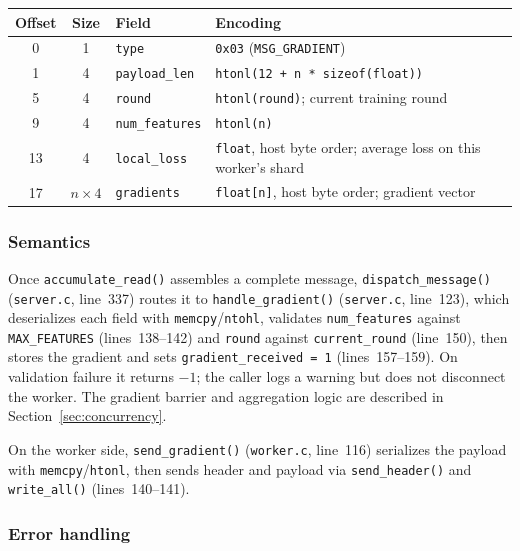 \documentclass[11pt]{article}
\begin{document}
\begin{table}[H]
\centering
\begin{tabular}{@{}c c l l@{}}
\toprule
\textbf{Offset} & \textbf{Size} & \textbf{Field} & \textbf{Encoding} \\
\midrule
0  & 1             & \texttt{type}         & \texttt{0x03} (\texttt{MSG\_GRADIENT}) \\
1  & 4             & \texttt{payload\_len} & \texttt{htonl(12 + n * sizeof(float))} \\
5  & 4             & \texttt{round}        & \texttt{htonl(round)}; current training round \\
9  & 4             & \texttt{num\_features} & \texttt{htonl(n)} \\
13 & 4             & \texttt{local\_loss}  & \texttt{float}, host byte order; average loss on this worker's shard \\
17 & $n \times 4$  & \texttt{gradients}    & \texttt{float[n]}, host byte order; gradient vector \\
\bottomrule
\end{tabular}
\end{table}

\subsubsection*{Semantics}
Once \texttt{accumulate\_read()} assembles a complete message,
\texttt{dispatch\_message()} (\texttt{server.c}, line~337) routes it to
\texttt{handle\_gradient()} (\texttt{server.c}, line~123), which deserializes
each field with \texttt{memcpy}/\texttt{ntohl}, validates
\texttt{num\_features} against \texttt{MAX\_FEATURES} (lines~138--142) and
\texttt{round} against \texttt{current\_round} (line~150), then stores the
gradient and sets \texttt{gradient\_received = 1} (lines~157--159). On
validation failure it returns $-1$; the caller logs a warning but does not
disconnect the worker. The gradient barrier and aggregation logic are described
in Section~\ref{sec:concurrency}.

On the worker side, \texttt{send\_gradient()} (\texttt{worker.c}, line~116)
serializes the payload with \texttt{memcpy}/\texttt{htonl}, then sends header
and payload via \texttt{send\_header()} and \texttt{write\_all()}
(lines~140--141).

\subsubsection*{Error handling}
\end{document}
